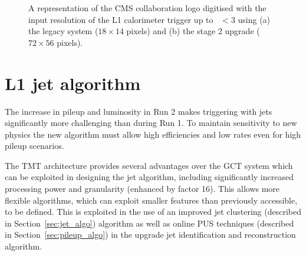 \begin{figure}
\centering
{} \quad
{} 
\caption{A representation of the CMS collaboration logo digitised with the input resolution of the L1 calorimeter trigger up to 
\etaabs~$< 3$ using (a) the legacy system ($18 \times 14$ pixels) and (b) the stage 2 upgrade ($72 \times 56$ pixels).}
\label{fig:inputres}
\end{figure}

\section{L1 jet algorithm}
\label{algo}

The increase in pileup and luminosity in Run 2 makes triggering with jets
significantly more challenging than during Run 1. To maintain sensitivity to
new physics the new algorithm must allow high efficiencies and
low rates even for high pileup scenarios.

The TMT architecture provides several advantages over the GCT system which can be 
exploited in designing the jet algorithm, including significantly increased processing power
and granularity (enhanced by factor 16). This allows more flexible algorithms, which can 
exploit smaller features than previously accessible, to be defined. This is exploited in the 
use of an improved jet clustering (described in Section~\ref{sec:jet_algo}) algorithm as well as 
online PUS techniques (described in Section~\ref{sec:pileup_algo}) in the upgrade jet 
identification and reconstruction algorithm.

